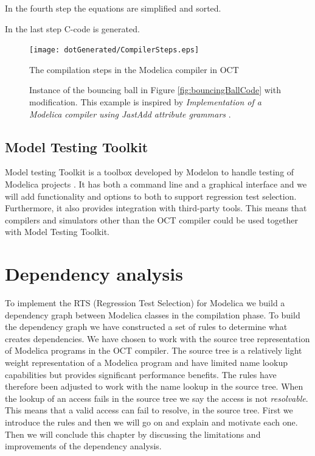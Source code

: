 \documentclass{cslthse-msc}
\begin{document}
In the fourth step the equations are simplified and sorted.

In the last step C-code is generated. 

\begin{figure}[!htbp]
    \centering
    {\texttt{[image: dotGenerated/CompilerSteps.eps]}}
    \caption{The compilation steps in the Modelica compiler in OCT}
    \label{fig:compilerSteps}
\end{figure}

\begin{figure}[!htbp]
    \centering
    
    \caption{Instance of the bouncing ball in Figure \ref{fig:bouncingBallCode} with modification. This example is inspired by \textit{Implementation of a Modelica compiler using JastAdd attribute grammars} \cite{aakesson2010implementation}.}
    \label{fig:bouncingBallInstance}
\end{figure}

\section{Model Testing Toolkit}
Model testing Toolkit is a toolbox developed by Modelon to handle testing of Modelica projects \cite{modelon.comMTT}. It has both a command line and a graphical interface and we will add functionality and options to both to support regression test selection. Furthermore, it also provides integration with third-party tools. This means that compilers and simulators other than the OCT compiler could be used together with Model Testing Toolkit.


\chapter[Dependency analysis]{Dependency analysis}
To implement the RTS (Regression Test Selection) for Modelica we build a dependency graph between Modelica classes in the compilation phase. To build the dependency graph we have constructed a set of rules to determine what creates dependencies. We have chosen to work with the source tree representation of Modelica programs in the OCT compiler. The source tree is a relatively light weight representation of a Modelica program and have limited name lookup capabilities but provides significant performance benefits. The rules have therefore been adjusted to work with the name lookup in the source tree. When the lookup of an access fails in the source tree we say the access is not \emph{resolvable}. This means that a valid access can fail to resolve, in the source tree. First we introduce the rules and then we will go on and explain and motivate each one. Then we will conclude this chapter by discussing the limitations and improvements of the dependency analysis.
\end{document}

